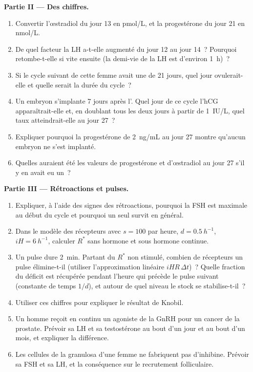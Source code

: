 \begin{problem}
\medskip
\noindent\textbf{Partie II --- Des chiffres.}
\begin{enumerate}[resume]
  \item Convertir l'œstradiol du jour 13 en \unit{pmol/L}, et la
        progestérone du jour 21 en \unit{nmol/L}.
  \item De quel facteur la LH a-t-elle augmenté du jour 12 au jour 14~?
        Pourquoi retombe-t-elle si vite ensuite (la demi-vie de la LH est
        d'environ \qty{1}{h})~?
  \item Si le cycle suivant de cette femme avait une 
        de 21 jours, quel jour ovulerait-elle et quelle serait la durée
        du cycle~?
  \item Un embryon s'implante 7 jours après l'. Quel jour de ce
        cycle l'hCG apparaîtrait-elle et, en doublant tous les deux jours
        à partir de \qty{1}{IU/L}, quel taux atteindrait-elle au jour
        27~?
  \item Expliquer pourquoi la progestérone de \qty{2}{ng/mL} au jour 27
        montre qu'aucun embryon ne s'est implanté.
  \item Quelles auraient été les valeurs de progestérone et d'œstradiol
        au jour 27 s'il y en avait eu un~?
\end{enumerate}

\medskip
\noindent\textbf{Partie III --- Rétroactions et pulses.}
\begin{enumerate}[resume]
  \item Expliquer, à l'aide des signes des rétroactions, pourquoi la FSH
        est maximale au début du cycle et pourquoi un seul 
        survit en général.
  \item Dans le modèle des récepteurs avec $s = 100$ par heure, $d =
        \qty{0.5}{h^{-1}}$, $iH = \qty{6}{h^{-1}}$, calculer $R^*$
        sans hormone et sous hormone continue.
  \item Un pulse dure \qty{2}{min}. Partant du $R^*$ non stimulé,
        combien de récepteurs un pulse élimine-t-il (utiliser
        l'approximation linéaire $iHR\,\Delta t$)~? Quelle fraction du
        déficit est récupérée pendant l'heure qui précède le pulse
        suivant (constante de temps $1/d$), et autour de quel niveau le
        stock se stabilise-t-il~?
  \item Utiliser ces chiffres pour expliquer le résultat de Knobil.
  \item Un homme reçoit en continu un agoniste de la GnRH pour un cancer
        de la prostate. Prévoir sa LH et sa testostérone au bout d'un
        jour et au bout d'un mois, et expliquer la différence.
  \item Les cellules de la granulosa d'une femme ne fabriquent pas
        d'inhibine. Prévoir sa FSH et sa LH, et la conséquence sur le
        recrutement folliculaire.
\end{enumerate}


\end{problem}
